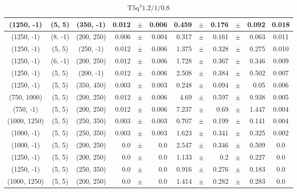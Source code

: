 \documentclass[12pt]{paper}
\newcommand{\TFiveqqqqHM}{\ensuremath{\textrm{T5q}^{4} 1.2/1/0.8}\xspace}
\begin{document}
\begin{table}[ht]
\begin{center}
{\begin{tabular}{|c|c|c|rrr|rrrrr|c|}
(1250, -1)&(5, 5)&(350, -1)&0.012&$\pm$&0.006&0.459&$\pm$&0.176&$\pm$&0.092&0.018\\\hline
(1250, -1)&(8, -1)&(200, 250)&0.006&$\pm$&0.004&0.317&$\pm$&0.161&$\pm$&0.063&0.011\\\hline
(1250, -1)&(5, 5)&(250, -1)&0.012&$\pm$&0.006&1.375&$\pm$&0.328&$\pm$&0.275&0.010\\\hline
(1250, -1)&(6, -1)&(200, 250)&0.012&$\pm$&0.006&1.728&$\pm$&0.367&$\pm$&0.346&0.009\\\hline
(1250, -1)&(5, 5)&(200, -1)&0.012&$\pm$&0.006&2.508&$\pm$&0.384&$\pm$&0.502&0.007\\\hline
(1250, -1)&(5, 5)&(350, 450)&0.003&$\pm$&0.003&0.248&$\pm$&0.094&$\pm$&0.05&0.006\\\hline
(750, 1000)&(5, 5)&(200, 250)&0.012&$\pm$&0.006&4.69&$\pm$&0.597&$\pm$&0.938&0.005\\\hline
(750, -1)&(5, 5)&(200, 250)&0.012&$\pm$&0.006&7.237&$\pm$&0.69&$\pm$&1.447&0.004\\\hline
(1000, 1250)&(5, 5)&(250, 350)&0.003&$\pm$&0.003&0.707&$\pm$&0.199&$\pm$&0.141&0.004\\\hline
(1000, -1)&(5, 5)&(250, 350)&0.003&$\pm$&0.003&1.623&$\pm$&0.341&$\pm$&0.325&0.002\\\hline
(1000, -1)&(5, 5)&(200, 250)&0.0&$\pm$&0.0&2.547&$\pm$&0.346&$\pm$&0.509&0.0\\\hline
(1250, -1)&(5, 5)&(200, 250)&0.0&$\pm$&0.0&1.133&$\pm$&0.2&$\pm$&0.227&0.0\\\hline
(1250, -1)&(5, 5)&(250, 350)&0.0&$\pm$&0.0&0.916&$\pm$&0.276&$\pm$&0.183&0.0\\\hline
(1000, 1250)&(5, 5)&(200, 250)&0.0&$\pm$&0.0&1.414&$\pm$&0.282&$\pm$&0.283&0.0\\\hline
\end{tabular}}\end{center}\caption{\TFiveqqqqHM}\end{table}
\end{document}
